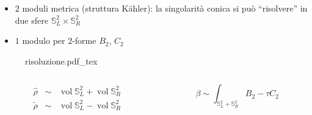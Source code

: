 \documentclass[aspectratio=43,mathserif]{beamer}
\newcommand{\ess}{\mathbb{S}}
\newcommand{\hatt}[1]{\ensuremath{\widehat{#1}}}
\newcommand{\tildd}[1]{\ensuremath{\widetilde{#1}}}
\newcommand{\vol}{\ensuremath{\operatorname{vol}}}
\begin{document}
\begin{frame}
	\begin{itemize}
		\item	$2$ moduli metrica (struttura K\"ahler): la singolarità conica si può ``risolvere'' in due sfere $\ess^2_L \times \ess^2_R$\\
			\vfill
		\item	$1$ modulo per 2-forme $B_2$, $C_2$
	\end{itemize}
	\vspace{-15pt}

	\begin{figure}[h!]\centering
		\def\svgscale{0.5}
		{risoluzione.pdf_tex}
	\end{figure}

	\vspace{-35pt}

	\begin{columns}
		\begin{column}{0.5\textwidth}

			\begin{align}
				\hatt\rho \;\; \sim\;\;  \vol \ess^2_L + \vol \ess^2_R\\
				\tildd\rho \;\; \sim\;\;  \vol \ess^2_L - \vol \ess^2_R
			\end{align}
		\end{column}
		\begin{column}{0.5\textwidth}
			\vfill
			\vspace{10pt}
			\begin{equation}
				\beta \sim \int_{\ess_L^2 + \ess_R^2} B_2 - \tau C_2
				\label{}
			\end{equation}
		\end{column}
	\end{columns}

%
%

\end{frame}
\end{document}
